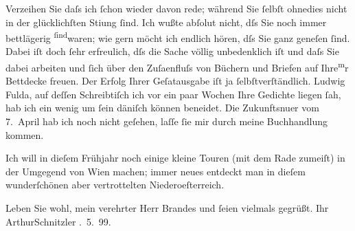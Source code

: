 \pstart
           Verzeihen Sie daſs ich{ }ſchon wieder davon rede; während Sie{ }ſelbſt ohnedies nicht in
               der glücklichſten Sti{\geminationm}ung{ }ſind. Ich wußte abſolut nicht,
               dſs Sie noch immer bettläge{\pb}rig \substVorne{}\textsuperscript{ſind}\substDazwischen{}waren\substHinten{}; wie gern möcht ich endlich hören, dſs Sie ganz geneſen{ }ſind. Dabei iſt doch{ }ſehr erfreulich, dſs die Sache völlig unbedenklich iſt und daſs Sie dabei arbeiten
               und{ }ſich über den Zuſa{\geminationm}enfluſs von Büchern und Briefen
               auf Ihre\substVorne{}\textsuperscript{m}\substDazwischen{}r\substHinten{} Bettdecke freuen. Der Erfolg Ihrer Geſa{\geminationm}tausgabe iſt ja{ }ſelbſtverſtändlich. Ludwig Fulda, auf deſſen
               Schreibtiſch ich vor ein paar Wochen {\pb}Ihre Gedichte liegen{ }ſah, hab ich
               ein wenig um{ }ſein däniſch können beneidet. Die
                  Zukunftsnu{\geminationm}er vom
                  7. April hab ich noch nicht geſehen, laſſe{ }ſie mir durch meine
               Buchhandlung kommen.\pend
           
\pstart
           Ich will in dieſem Frühjahr noch einige kleine Touren (mit dem Rade zumeiſt) in der
               Umgegend von Wien machen; immer neues entdeckt man
               in dieſem wunderſchönen aber vertrottelten Niederoeſterreich.\pend
           
\pstart
           {\pb}Leben Sie wohl, mein verehrter Herr Brandes und{ }ſeien vielmals gegrüßt.\pend
           \pstart Ihr \spacefill\mbox{ArthurSchnitzler}\pend{}
. 5. 99.\pend
           \endnumbering{}  \newcommand{\dateiname}{L00917}\newcommand{\titel}{Arthur Schnitzler an Georg Brandes, 19. 5. 1899}\newcommand{\editorInnen}{Martin Anton Müller und Gerd-Hermann Susen}
